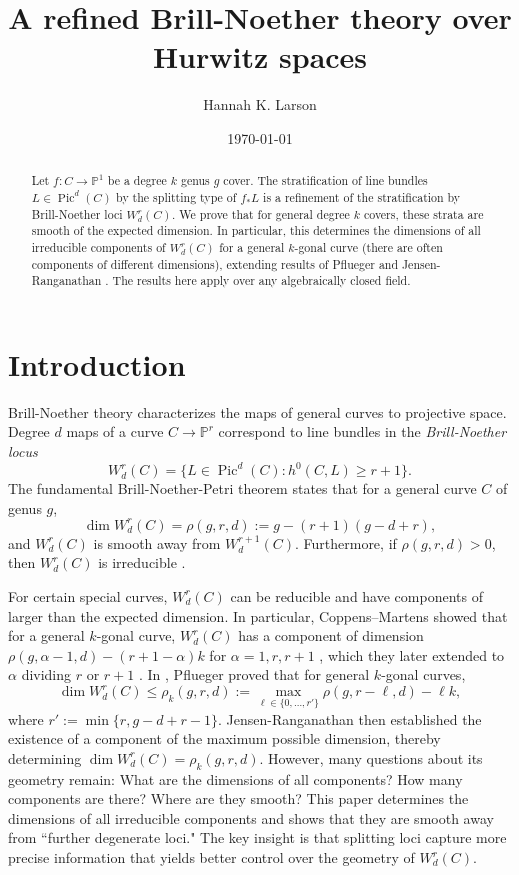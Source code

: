 \documentclass[12pt]{amsart}
\title{A refined Brill-Noether theory over Hurwitz spaces}
\author{Hannah K. Larson}
\date{\today}
\newcommand{\pp}{\mathbb{P}}
\DeclareMathOperator{\Pic}{Pic}
\theoremstyle{definition}
\theoremstyle{remark}
\theoremstyle{remark}
\numberwithin{equation}{section}
\begin{document}
\maketitle

\begin{abstract}
Let $f\colon  C \rightarrow \pp^1$ be a degree $k$ genus $g$ cover.
The stratification of line bundles $L \in \Pic^d(C)$ by the splitting type of $f_*L$ is a refinement of the stratification by Brill-Noether loci $W^r_d(C)$.
We prove that for general degree $k$ covers, these strata are smooth of the expected dimension.
In particular, this determines the dimensions of all irreducible components of $W^r_d(C)$ for a general $k$-gonal curve (there are often components of different dimensions), extending results of Pflueger \cite{Pf} and Jensen-Ranganathan \cite{JR}. The results here apply over any algebraically closed field.
\end{abstract}

\section{Introduction}

Brill-Noether theory characterizes the maps of general curves to projective space. 
Degree $d$ maps of a curve $C \rightarrow \pp^r$ correspond to line bundles in the \textit{Brill-Noether locus}
\[W^r_d(C) = \{ L \in \Pic^d(C): h^0(C, L) \geq r+1\}.\] 
The fundamental Brill-Noether-Petri theorem \cite{GH,G} states that for a general curve $C$ of genus $g$, 
\[\dim W^r_d(C) = \rho(g, r, d) := g - (r+1)(g - d + r),\]
and $W^r_d(C)$ is smooth away from $W^{r+1}_d(C)$. Furthermore, if $\rho(g, r, d) > 0$, then $W^r_d(C)$ is irreducible \cite{FL}.


For certain special curves, $W^r_d(C)$ can be reducible and have components of larger than the expected dimension.
In particular, Coppens--Martens showed that for a general $k$-gonal curve, $W^r_d(C)$ has a component of dimension $\rho(g, \alpha - 1, d) - (r+1 - \alpha)k$ for $\alpha = 1, r, r+1$ \cite{CM1}, which they later extended to $\alpha$ dividing $r$ or $r+1$ \cite{CM2}.
In \cite{Pf}, Pflueger proved that for general $k$-gonal curves,
\begin{equation} \label{theirformula}
\dim W^r_d(C) \leq \rho_k(g, r, d) := \max_{\ell \in \{0, \ldots, r'\}} \rho(g, r - \ell, d) - \ell k,
\end{equation}
where $r' := \min\{r, g-d+r -1\}$.
Jensen-Ranganathan \cite{JR} then established the existence of a component of the maximum possible dimension, thereby determining $\dim W^r_d(C) = \rho_k(g, r, d)$. 
However, many questions about its geometry remain: What are the dimensions of all components? How many components are there? Where are they smooth?
This paper determines the dimensions of all irreducible components and shows that they are smooth away from ``further degenerate loci." The key insight is that splitting loci capture more precise information that yields better control over the geometry of $W^r_d(C)$. 
\end{document}
